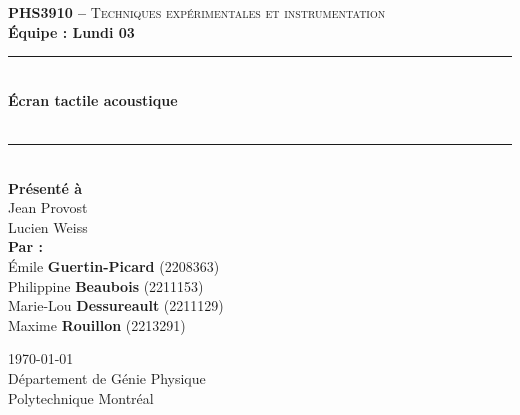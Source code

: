 ﻿\documentclass[11pt,letterpaper]{article}
\begin{document}
\begin{titlepage}
\center

\begin{figure}
\end{figure}
\vspace*{2 cm}

\textsc{\Large \textbf{PHS3910 --} Techniques expérimentales et instrumentation}\\[0.5cm]
\large{\textbf{Équipe : Lundi 03}}\\[1.5cm]

\rule{\linewidth}{0.5mm} \\[0.5cm]
\Large{\textbf{Écran tactile acoustique}} \\[0.2cm]
\\
\rule{\linewidth}{0.2mm} \\[2.3cm]

\large{\textbf{Présenté à}\\
  Jean Provost\\
  Lucien Weiss\\[2.5cm]
  \textbf{Par :}\\
  Émile \textbf{Guertin-Picard} (2208363)\\
  Philippine \textbf{Beaubois} (2211153)\\
  Marie-Lou \textbf{Dessureault} (2211129)\\
  Maxime \textbf{Rouillon} (2213291)\\[3cm]}

\large{\today\\
Département de Génie Physique\\
Polytechnique Montréal\\}

\end{titlepage}


\tableofcontents
{}
\newpage

\pagestyle{fancy}
\setlength{\headheight}{14pt}
\renewcommand{\headrulewidth}{0pt}
\fancyfoot[R]{\thepage}

\pagestyle{fancy}
\fancyhf{}
\renewcommand{\headrulewidth}{1pt}
\fancyhead[R]{\today}
\fancyfoot[R]{\thepage}

\setcounter{page}{1}
\end{document}
